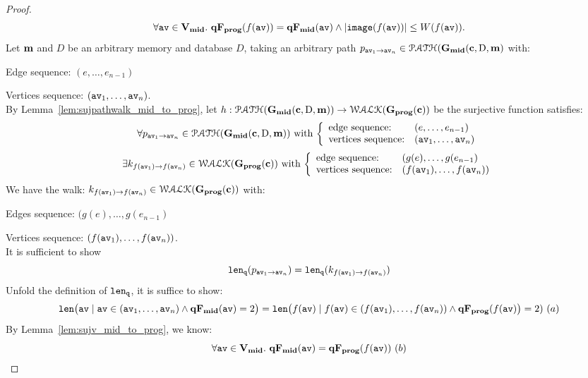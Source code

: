 \documentclass[a4paper,11pt]{article}
\begin{document}
{\begin{proof}
%
$$
\forall \mathtt{av} \in \mathtt{\bf{V_{mid}}}. ~ \mathtt{\bf{qF_{prog}}}(f(\mathtt{av})) = \mathtt{\bf{qF_{mid}}}(\mathtt{av}) 
\land |\mathtt{image}(f(\mathtt{av}))| \leq W(f(\mathtt{av})).
$$
%
%
%
Let ${\boldsymbol{\mathbf{m}}}$ and $D$ be an arbitrary memory and database $D$,
taking an arbitrary path $p_{\mathtt{av}_1 \to \mathtt{av}_n} \in \mathcal{PATH}(\mathtt{\bf{G_{mid}}}({\boldsymbol{\mathbf{c}}}, \text{D}, {\boldsymbol{\mathbf{m}}})$ with:
%
\item Edge sequence: $(e, \ldots, e_{n-1})$
%
\item Vertices sequence: $(\mathtt{av}_1, \ldots, \mathtt{av}_n)$.
\\
By Lemma~\ref{lem:sujpathwalk_mid_to_prog}, let $h: \mathcal{PATH}(\mathtt{\bf{G_{mid}}}({\boldsymbol{\mathbf{c}}}, \text{D}, {\boldsymbol{\mathbf{m}}})) \to \mathcal{WALK}(\mathtt{\bf{G_{prog}}}({\boldsymbol{\mathbf{c}}}))$ be the surjective function satisfies:
%
\[
	\forall p_{\av_1 \to \av_n} \in \paths(\midG(\ssa{c}, \text{D}, \ssa{m}))
	\text{ with }
	\left\{
	\begin{array}{ll}
	\mbox{edge sequence:} & (e, \ldots, e_{n-1})
	\\ 
	\mbox{vertices sequence:} & (\av_1, \ldots, \av_n)
	\end{array}
	\right.
\]
%
\[
	\exists k_{f(\av_1) \to f(\av_n)} \in \walks(\progG(\ssa{c}))
	\text{ with }
	\left\{
	\begin{array}{ll}
	\mbox{edge sequence:} & (g(e), \ldots, g(e_{n-1}) 
	\\ 
	\mbox{vertices sequence:} & (f(\av_1), \ldots, f(\av_{n}))
	\end{array}
	\right.
\]
%
We have the walk:
$k_{f(\mathtt{av}_1) \to f(\mathtt{av}_n)} \in \mathcal{WALK}(\mathtt{\bf{G_{prog}}}({\boldsymbol{\mathbf{c}}}))$ with:
%
\item Edges sequence: $(g(e), \ldots, g(e_{n-1}) $
%
\item Vertices sequence: $(f(\mathtt{av}_1), \ldots, f(\mathtt{av}_{n}))$.
\\
It is sufficient to show 
%
\[
	\mathtt{len}_{\tt q}(p_{\mathtt{av}_1 \to \mathtt{av}_n}) = \mathtt{len}_{\tt q}(k_{f(\mathtt{av}_1) \to f(\mathtt{av}_n)})
\]
%
Unfold the definition of $\mathtt{len}_{\tt q}$, it is suffice to show:
\[
\mathtt{len} \big( \mathtt{av} \mid \mathtt{av} \in (\mathtt{av}_1, \ldots, \mathtt{av}_n) \land \mathtt{\bf{qF_{mid}}}(\mathtt{av}) = 2 \big) 
= \mathtt{len} \big(f(\mathtt{av}) \mid f(\mathtt{av}) \in (f(\mathtt{av}_1), \ldots, f(\mathtt{av}_{n})) \land \mathtt{\bf{qF_{prog}}}(f(\mathtt{av})\big) = 2)	
~ (a)
\]
%
By Lemma~\ref{lem:sujv_mid_to_prog}, we know:
%
\[
	\forall \mathtt{av} \in \mathtt{\bf{V_{mid}}}. ~ \mathtt{\bf{qF_{mid}}}(\mathtt{av}) = \mathtt{\bf{qF_{prog}}}(f(\mathtt{av})) ~(b)
\]
\end{proof}}
\end{document}
